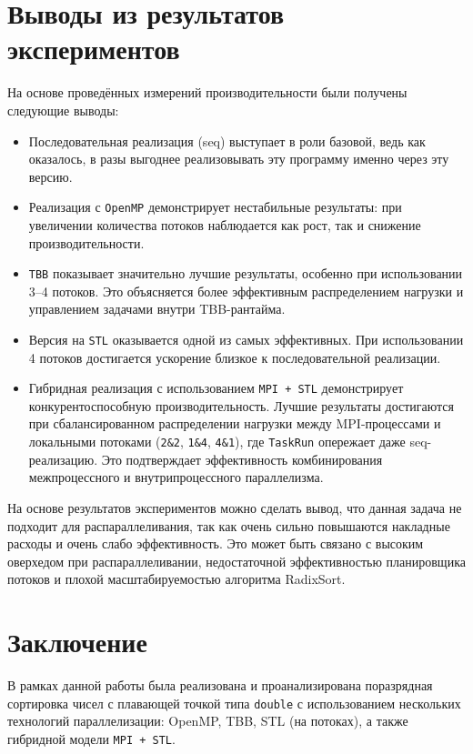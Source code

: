 \documentclass[12pt]{article}
\begin{document}
\newpage

\section{Выводы из результатов экспериментов}

На основе проведённых измерений производительности были получены следующие выводы:
\begin{itemize}
  \item Последовательная реализация (seq) выступает в роли базовой, ведь как оказалось, в разы выгоднее реализовывать эту программу именно через эту версию.
  \item Реализация с \texttt{OpenMP} демонстрирует нестабильные результаты: при увеличении количества потоков наблюдается как рост, так и снижение производительности.
  \item \texttt{TBB} показывает значительно лучшие результаты, особенно при использовании 3--4 потоков. Это объясняется более эффективным распределением нагрузки и управлением задачами внутри TBB-рантайма.
  \item Версия на \texttt{STL} оказывается одной из самых эффективных. При использовании 4 потоков достигается ускорение близкое к последовательной реализации.
  \item Гибридная реализация с использованием \texttt{MPI + STL} демонстрирует конкурентоспособную производительность. Лучшие результаты достигаются при сбалансированном распределении нагрузки между MPI-процессами и локальными потоками (\texttt{2\&2}, \texttt{1\&4}, \texttt{4\&1}), где \texttt{TaskRun} опережает даже seq-реализацию. Это подтверждает эффективность комбинирования межпроцессного и внутрипроцессного параллелизма.
\end{itemize}

На основе результатов экспериментов можно сделать вывод, что данная задача не подходит для распараллеливания, так как очень сильно повышаются накладные расходы и очень слабо эффективность.  Это может быть связано с высоким оверхедом при распараллеливании, недостаточной эффективностью планировщика потоков и плохой масштабируемостью алгоритма RadixSort.

\newpage

\section{Заключение}

В рамках данной работы была реализована и проанализирована поразрядная сортировка чисел с плавающей точкой типа \texttt{double} с использованием нескольких технологий параллелизации: OpenMP, TBB, STL (на потоках), а также гибридной модели \texttt{MPI + STL}.
\end{document}
